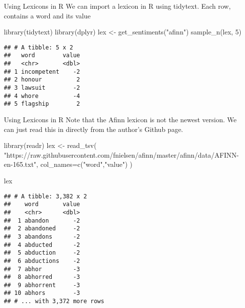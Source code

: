 \documentclass[
  10pt,
  ignorenonframetext,
  aspectratio=169]{beamer}
\newenvironment{Shaded}{\begin{snugshade}}{\end{snugshade}}
\newcommand{\AttributeTok}[1]{\textcolor[rgb]{0.80,0.80,0.80}{#1}}
\newcommand{\DecValTok}[1]{\textcolor[rgb]{0.86,0.86,0.80}{#1}}
\newcommand{\FunctionTok}[1]{\textcolor[rgb]{0.94,0.94,0.56}{#1}}
\newcommand{\NormalTok}[1]{\textcolor[rgb]{0.80,0.80,0.80}{#1}}
\newcommand{\OtherTok}[1]{\textcolor[rgb]{0.94,0.94,0.56}{#1}}
\newcommand{\StringTok}[1]{\textcolor[rgb]{0.80,0.58,0.58}{#1}}
\begin{document}
\begin{frame}[fragile]{Using Lexicons in R}
\protect\hypertarget{using-lexicons-in-r}{}
We can import a lexicon in R using tidytext. Each row, contains a word
and its value

\medskip

\begin{Shaded}
\begin{Highlighting}[]
\FunctionTok{library}\NormalTok{(tidytext)}
\FunctionTok{library}\NormalTok{(dplyr)}
\NormalTok{lex }\OtherTok{\textless{}{-}} \FunctionTok{get\_sentiments}\NormalTok{(}\StringTok{"afinn"}\NormalTok{)}
\FunctionTok{sample\_n}\NormalTok{(lex, }\DecValTok{5}\NormalTok{)}
\end{Highlighting}
\end{Shaded}

\begin{verbatim}
## # A tibble: 5 x 2
##   word        value
##   <chr>       <dbl>
## 1 incompetent    -2
## 2 honour          2
## 3 lawsuit        -2
## 4 whore          -4
## 5 flagship        2
\end{verbatim}
\end{frame}

\begin{frame}[fragile]{Using Lexicons in R}
\protect\hypertarget{using-lexicons-in-r-1}{}
Note that the Afinn lexicon is not the newest version. We can just read
this in directly from the author's Github page.

\medskip

\begin{Shaded}
\begin{Highlighting}[]
\FunctionTok{library}\NormalTok{(readr)}
\NormalTok{lex }\OtherTok{\textless{}{-}} \FunctionTok{read\_tsv}\NormalTok{(}
  \StringTok{"https://raw.githubusercontent.com/fnielsen/afinn/master/afinn/data/AFINN{-}en{-}165.txt"}\NormalTok{,}
  \AttributeTok{col\_names=}\FunctionTok{c}\NormalTok{(}\StringTok{"word"}\NormalTok{,}\StringTok{"value"}\NormalTok{)}
\NormalTok{)}

\NormalTok{lex}
\end{Highlighting}
\end{Shaded}

\begin{verbatim}
## # A tibble: 3,382 x 2
##    word       value
##    <chr>      <dbl>
##  1 abandon       -2
##  2 abandoned     -2
##  3 abandons      -2
##  4 abducted      -2
##  5 abduction     -2
##  6 abductions    -2
##  7 abhor         -3
##  8 abhorred      -3
##  9 abhorrent     -3
## 10 abhors        -3
## # ... with 3,372 more rows
\end{verbatim}
\end{frame}
\end{document}
